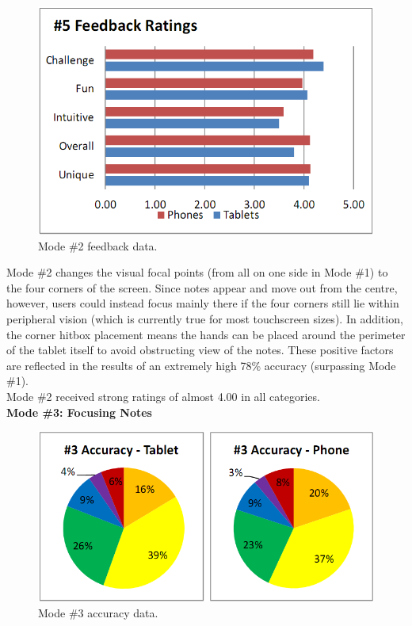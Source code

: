 \documentclass{sig-alternate}
\begin{document}
\begin{figure}[htb!]
	\begin{center}
		\includegraphics[width=1\linewidth]{figure_chart_rating_2}
	\end{center}
	\vspace{-12pt}
	\caption{Mode \#2 feedback data.}
	\label{fig:chart_rating_2}
\end{figure}

Mode \#2 changes the visual focal points (from all on one side in Mode \#1) to the four corners of the screen. Since notes appear and move out from the centre, however, users could instead focus mainly there if the four corners still lie within peripheral vision (which is currently true for most touchscreen sizes). In addition, the corner hitbox placement means the hands can be placed around the perimeter of the tablet itself to avoid obstructing view of the notes. These positive factors are reflected in the results of an extremely high 78\% accuracy (surpassing Mode \#1).\\

Mode \#2 received strong ratings of almost 4.00 in all categories. \\

\newpage
\noindent \textbf{Mode \#3: Focusing Notes}

\begin{figure}[htb!]
	\begin{center}
		\includegraphics[width=1\linewidth]{figure_chart_accuracy_3}
	\end{center}
	\vspace{-12pt}
	\caption{Mode \#3 accuracy data.}
	\label{fig:chart_accuracy_3}
\end{figure}
\end{document}
